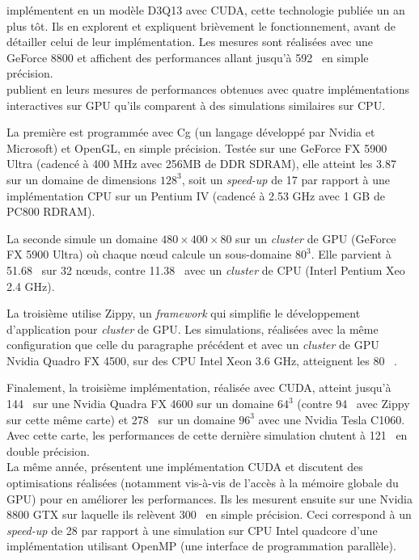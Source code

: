 \citet{toelke_teraflop_2008} implémentent en \citeyear{toelke_teraflop_2008}  un modèle D3Q13 avec CUDA, cette technologie publiée un an plus tôt. Ils en explorent et expliquent brièvement le fonctionnement, avant de détailler celui de leur implémentation. Les mesures sont réalisées avec une GeForce 8800 et affichent des performances allant jusqu'à 592~  en simple précision.\\

\citet{kaufman_implementing_2009} publient en \citeyear{kaufman_implementing_2009} leurs mesures de performances obtenues avec quatre implémentations interactives sur \acs{GPU} qu'ils comparent à des simulations similaires sur \acs{CPU}. 

La première est programmée avec Cg (un langage développé par Nvidia et Microsoft) et OpenGL, en simple précision. Testée sur une GeForce FX 5900 Ultra (cadencé à 400 MHz avec 256MB de DDR SDRAM), elle atteint les 3.87~  sur un domaine de dimensions $128^3$, soit un \textit{speed-up} de 17 par rapport à une implémentation \acs{CPU} sur un Pentium IV (cadencé à 2.53 GHz avec 1 GB de PC800 RDRAM).

La seconde simule un domaine $480 \times 400 \times 80$ sur un \textit{cluster} de \acs{GPU} (GeForce FX 5900 Ultra) où chaque nœud calcule un sous-domaine $80^3$. Elle parvient à 51.68~  sur 32 nœuds, contre 11.38~  avec un \textit{cluster} de \acs{CPU} (Interl Pentium Xeo 2.4 GHz).

La troisième utilise Zippy, un \textit{framework} qui simplifie le développement d'application pour \textit{cluster} de \acs{GPU}. Les simulations, réalisées avec la même configuration que celle du paragraphe précédent et avec un \textit{cluster} de \acs{GPU} Nvidia Quadro FX 4500, sur des \acs{CPU} Intel Xeon 3.6 GHz, atteignent les 80~ .

Finalement, la troisième implémentation, réalisée avec CUDA, atteint jusqu'à 144~  sur une Nvidia Quadra FX 4600 sur un domaine $64^3$ (contre 94~  avec Zippy sur cette même carte) et 278~  sur un domaine $96^3$ avec une Nvidia Tesla C1060. Avec cette carte, les performances de cette dernière simulation chutent à 121~  en double précision.\\

La même année, \citet{bailey_accelerating_2009} présentent une implémentation CUDA et discutent des optimisations réalisées (notamment vis-à-vis de l'accès à la mémoire globale du \acs{GPU}) pour en améliorer les performances. Ils les mesurent ensuite sur une Nvidia 8800 GTX sur laquelle ils relèvent 300~ en simple précision. Ceci correspond à un \textit{speed-up} de 28 par rapport à une simulation sur \acs{CPU} Intel quadcore d'une implémentation utilisant OpenMP (une interface de programmation parallèle). 

